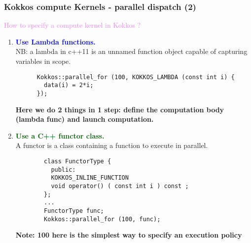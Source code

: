 \begin{frame}[fragile=singleslide]
  \frametitle{Kokkos compute Kernels - parallel dispatch (2)}

  {\large \textcolor{violet}{How to specify a compute kernel in Kokkos ?}}
  \begin{enumerate}
  \item \textcolor{blue}{\textbf{Use Lambda functions.}}\\
    NB: a lambda in c++11 is an unnamed function object capable of capturing variables in scope.
    \begin{verbatim}
      Kokkos::parallel_for (100, KOKKOS_LAMBDA (const int i) {
        data(i) = 2*i;
      });
    \end{verbatim}
    \textbf{Here we do 2 things in 1 step: define the computation body (lambda func) and launch computation.}
  \item \textcolor{darkgreen}{\textbf{Use a C++ functor class.}}\\
    A functor is a class containing a function to execute in parallel.
    {\small
      \begin{verbatim}
        class FunctorType {
          public:
          KOKKOS_INLINE_FUNCTION
          void operator() ( const int i ) const ;
        };
        ...
        FunctorType func;
        Kokkos::parallel_for (100, func);
      \end{verbatim}
    }
    \textbf{Note: 100 here is the simplest way to specify an execution policy}
  \end{enumerate}

\end{frame}

